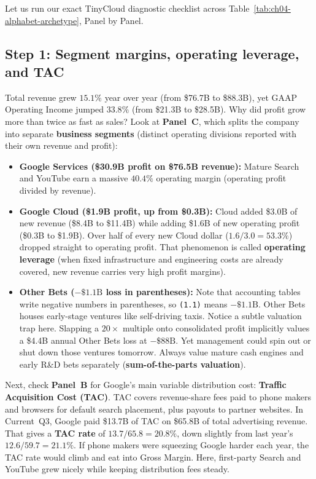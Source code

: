 Let us run our exact TinyCloud diagnostic checklist across Table~\ref{tab:ch04-alphabet-archetype}, Panel by Panel.

\subsection{Step 1: Segment margins, operating leverage, and TAC}

Total revenue grew $15.1\%$ year over year (from \$76.7B to \$88.3B), yet GAAP Operating Income jumped $33.8\%$ (from \$21.3B to \$28.5B). Why did profit grow more than twice as fast as sales? Look at \textbf{Panel~C}, which splits the company into separate \textbf{business segments} (distinct operating divisions reported with their own revenue and profit):
\begin{itemize}
  \item \textbf{Google Services (\$30.9B profit on \$76.5B revenue):} Mature Search and YouTube earn a massive $40.4\%$ operating margin (operating profit divided by revenue).
  \item \textbf{Google Cloud (\$1.9B profit, up from \$0.3B):} Cloud added \$3.0B of new revenue (\$8.4B to \$11.4B) while adding \$1.6B of new operating profit (\$0.3B to \$1.9B). Over half of every new Cloud dollar ($1.6 / 3.0 = 53.3\%$) dropped straight to operating profit. That phenomenon is called \textbf{operating leverage} (when fixed infrastructure and engineering costs are already covered, new revenue carries very high profit margins).
  \item \textbf{Other Bets ($-\$1.1\text{B}$ loss in parentheses):} Note that accounting tables write negative numbers in parentheses, so \texttt{(1.1)} means $-\$1.1\text{B}$. Other Bets houses early-stage ventures like self-driving taxis. Notice a subtle valuation trap here. Slapping a $20\times$ multiple onto consolidated profit implicitly values a \$4.4B annual Other Bets loss at $-\$88\text{B}$. Yet management could spin out or shut down those ventures tomorrow. Always value mature cash engines and early R\&D bets separately (\textbf{sum-of-the-parts valuation}).
\end{itemize}

Next, check \textbf{Panel~B} for Google's main variable distribution cost: \textbf{Traffic Acquisition Cost (TAC)}. TAC covers revenue-share fees paid to phone makers and browsers for default search placement, plus payouts to partner websites. In Current~Q3, Google paid \$13.7B of TAC on \$65.8B of total advertising revenue. That gives a \textbf{TAC rate} of $13.7 / 65.8 = 20.8\%$, down slightly from last year's $12.6 / 59.7 = 21.1\%$. If phone makers were squeezing Google harder each year, the TAC rate would climb and eat into Gross Margin. Here, first-party Search and YouTube grew nicely while keeping distribution fees steady.

